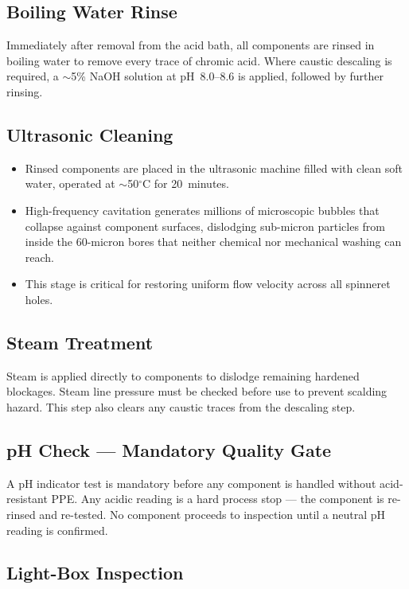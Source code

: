 \documentclass{book}
\begin{document}
\subsection{Boiling Water Rinse}

Immediately after removal from the acid bath, all components are rinsed in boiling water to remove every trace of chromic acid. Where caustic descaling is required, a $\sim$5\% NaOH solution at pH~8.0--8.6 is applied, followed by further rinsing.

\subsection{Ultrasonic Cleaning}

\begin{itemize}[leftmargin=1.5em]
  \item Rinsed components are placed in the ultrasonic machine filled with clean soft water, operated at $\sim$50$^\circ$C for 20~minutes.
  \item High-frequency cavitation generates millions of microscopic bubbles that collapse against component surfaces, dislodging sub-micron particles from inside the 60-micron bores that neither chemical nor mechanical washing can reach.
  \item This stage is critical for restoring uniform flow velocity across all spinneret holes.
\end{itemize}

\subsection{Steam Treatment}

Steam is applied directly to components to dislodge remaining hardened blockages. Steam line pressure must be checked before use to prevent scalding hazard. This step also clears any caustic traces from the descaling step.

\subsection{pH Check --- Mandatory Quality Gate}

A pH indicator test is mandatory before any component is handled without acid-resistant PPE. Any acidic reading is a hard process stop --- the component is re-rinsed and re-tested. No component proceeds to inspection until a neutral pH reading is confirmed.

\subsection{Light-Box Inspection}
\end{document}
